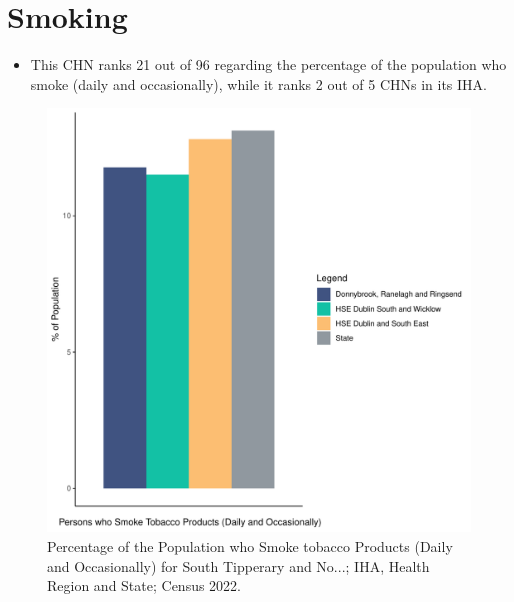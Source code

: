 \documentclass{article}
\begin{document}
\pagebreak

\section{Smoking}\label{sect:Smoking}
\begin{itemize}
\item This CHN ranks  21 out of 96 regarding the percentage of the population who smoke (daily and occasionally), while it ranks   2 out of 5 CHNs in its IHA.
\end{itemize}
\begin{figure}[H]
	\centering
	\includegraphics[width = 120mm]{../figures/SmokingED.pdf}
	\caption{Percentage of the Population who Smoke tobacco Products (Daily and Occasionally) for South Tipperary and No...; IHA, Health Region and State; Census 2022.}
	\label{fig:2ae19629-1a6a-13a3-e055-000000000001}
	\end{figure}
	
\end{document}
